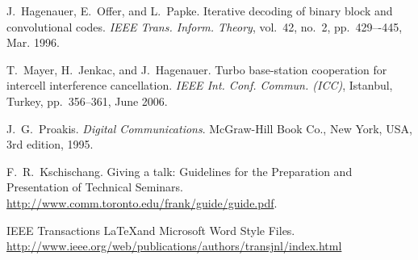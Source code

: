 \documentclass[journal, a4paper]{IEEEtran}
\begin{document}
\begin{thebibliography}{5}
    J.~Hagenauer, E.~Offer, and L.~Papke. Iterative decoding of binary block
    and convolutional codes. {\em IEEE Trans. Inform. Theory},
    vol.~42, no.~2, pp.~429–-445, Mar. 1996.

    T.~Mayer, H.~Jenkac, and J.~Hagenauer. Turbo base-station cooperation for intercell interference cancellation. {\em IEEE Int. Conf. Commun. (ICC)}, Istanbul, Turkey, pp.~356--361, June 2006.

    J.~G.~Proakis. {\em Digital Communications}. McGraw-Hill Book Co.,
    New York, USA, 3rd edition, 1995.

    F.~R.~Kschischang. Giving a talk: Guidelines for the Preparation and Presentation of Technical Seminars.
    \url{http://www.comm.toronto.edu/frank/guide/guide.pdf}.

    IEEE Transactions \LaTeX and Microsoft Word Style Files.
    \url{http://www.ieee.org/web/publications/authors/transjnl/index.html}



\end{thebibliography}

\end{document}
